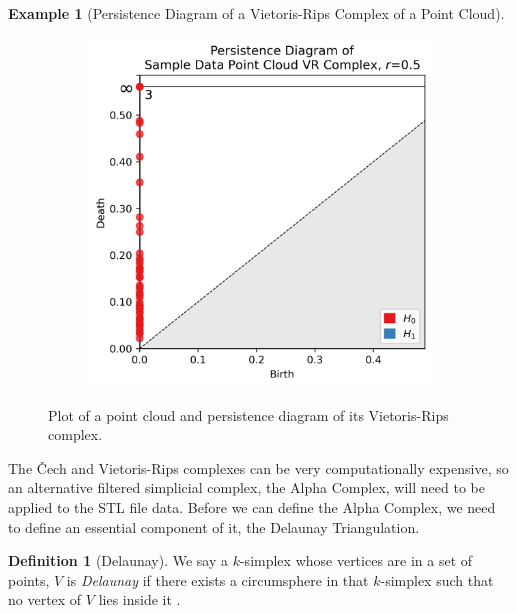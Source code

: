 \documentclass[ma]{uncgdissertationexp}
\theoremstyle{plain}
\theoremstyle{definition}
\newtheorem{definition}[theorem]{Definition}
\newtheorem{example}[theorem]{Example}
\theoremstyle{remark}
\begin{document}
\begin{example}[Persistence Diagram of a Vietoris-Rips Complex of a Point Cloud]
\begin{figure}[H]
\begin{subfigure}[b]{0.45\textwidth}
        \includegraphics[width=\textwidth]{point_cloud_persdia_vr_0_5.png}
    \end{subfigure}
    \caption{Plot of a point cloud and persistence diagram of its Vietoris-Rips complex.}
    \label{fig:point_cloud_persdia}
\end{figure}
\end{example}

\newpage
\par The Čech and Vietoris-Rips complexes can be very computationally expensive, so an alternative filtered simplicial complex, the Alpha Complex, will need to be applied to the STL file data. Before we can define the Alpha Complex, we need to define an essential component of it, the Delaunay Triangulation.

\begin{definition}[Delaunay] We say a $k$-simplex whose vertices are in a set of points, $V$ is \textit{Delaunay} if there exists a circumsphere in that $k$-simplex such that no vertex of $V$ lies inside it \cite{tetgen}.
\end{definition}
\end{document}
